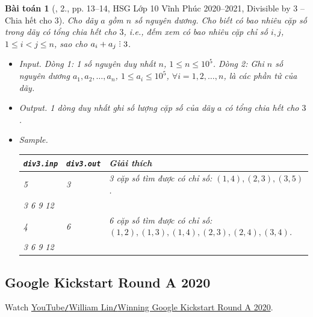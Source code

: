 \documentclass{article}
\newtheorem{baitoan}{Bài toán}
\DeclareRobustCommand{\divby}{%
	\mathrel{\vbox{\baselineskip.65ex\lineskiplimit0pt\hbox{.}\hbox{.}\hbox{.}}}%
}
\begin{document}
\begin{baitoan}[\cite{Trung_HSG_THPT_Tin}, 2., pp. 13--14, HSG Lớp 10 Vĩnh Phúc 2020--2021, Divisible by 3 -- Chia hết cho 3]
	Cho dãy $a$ gồm $n$ số nguyên dương. Cho biết có bao nhiêu cặp số trong dãy có tổng chia hết cho $3$, i.e., đếm xem có bao nhiêu cặp chỉ số $i,j$, $1\le i < j\le n$, sao cho $a_i + a_j\divby3$.
	\begin{itemize}
		\item {\sf Input.} Dòng 1: 1 số nguyên duy nhất $n$, $1\le n\le10^5$. Dòng 2: Ghi $n$ số nguyên dương $a_1,a_2,\ldots,a_n$, $1\le a_i\le10^5$, $\forall i = 1,2,\ldots,n$, là các phần tử của dãy.
		\item {\sf Output.} 1 dòng duy nhất ghi số lượng cặp số của dãy $a$ có tổng chia hết cho $3$.
		\item {\sf Sample.}
		\begin{table}[H]
			\centering
			\begin{tabular}{|l|l|l|}
				\hline
				\texttt{div3.inp} & \texttt{div3.out} & Giải thích \\
				\hline
				5 & 3 & 3 cặp số tìm được có chỉ số: $(1,4),(2,3),(3,5)$. \\
				3 6 9 12 & & \\
				\hline
				4 & 6 & 6 cặp số tìm được có chỉ số: $(1,2),(1,3),(1,4),(2,3),(2,4),(3,4)$. \\
				3 6 9 12 & & \\
				\hline
			\end{tabular}
		\end{table}
	\end{itemize}
\end{baitoan}


\subsection{Google Kickstart Round A 2020}
Watch \href{https://www.youtube.com/watch?v=uGrBHohIgQY}{YouTube\texttt{/}William Lin\texttt{/}Winning Google Kickstart Round A 2020}.
\end{document}
